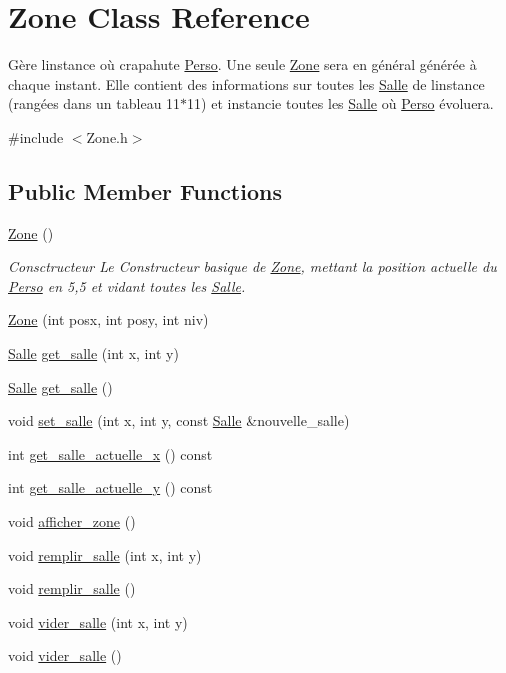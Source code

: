 \hypertarget{classZone}{}\section{Zone Class Reference}
\label{classZone}


Gère l\textquotesingle{}instance où crapahute \hyperlink{classPerso}{Perso}. Une seule \hyperlink{classZone}{Zone} sera en général générée à chaque instant. Elle contient des informations sur toutes les \hyperlink{classSalle}{Salle} de l\textquotesingle{}instance (rangées dans un tableau 11$\ast$11) et instancie toutes les \hyperlink{classSalle}{Salle} où \hyperlink{classPerso}{Perso} évoluera.  




{\ttfamily \#include $<$Zone.\+h$>$}

\subsection*{Public Member Functions}
\begin{DoxyCompactItemize}
\item 
\hyperlink{classZone_a37c9721c0d592a7a231f4e6dbae93277}{Zone} ()
\begin{DoxyCompactList}\small\item\em Consctructeur Le Constructeur basique de \hyperlink{classZone}{Zone}, mettant la position actuelle du \hyperlink{classPerso}{Perso} en 5,5 et vidant toutes les \hyperlink{classSalle}{Salle}. \end{DoxyCompactList}\item 
\hyperlink{classZone_a47c33a8aad7a0c17ff8ab213aad492f7}{Zone} (int posx, int posy, int niv)
\item 
\hyperlink{classSalle}{Salle} \hyperlink{classZone_a6b28456d584e884cdeceaf6d4dcedbd1}{get\+\_\+salle} (int x, int y)
\item 
\hyperlink{classSalle}{Salle} \hyperlink{classZone_ab49f3b9677e9111970689cf26fa47b00}{get\+\_\+salle} ()
\item 
void \hyperlink{classZone_a5c68a620d5c32cd2bf26272aeaee557d}{set\+\_\+salle} (int x, int y, const \hyperlink{classSalle}{Salle} \&nouvelle\+\_\+salle)
\item 
int \hyperlink{classZone_a5cba037223549a19e4717c9a502895ca}{get\+\_\+salle\+\_\+actuelle\+\_\+x} () const 
\item 
int \hyperlink{classZone_a481d145df776bb245a223e6848b9a6d6}{get\+\_\+salle\+\_\+actuelle\+\_\+y} () const 
\item 
void \hyperlink{classZone_ae7fc481efb7e4bb2fc28bb5da0bbaf90}{afficher\+\_\+zone} ()
\item 
void \hyperlink{classZone_ae97ba3cc2a452803a66dbd3c0c84852b}{remplir\+\_\+salle} (int x, int y)
\item 
void \hyperlink{classZone_a76284023033d6b67f933b4656a8eb761}{remplir\+\_\+salle} ()
\item 
void \hyperlink{classZone_a296f45a66db2f5ad565d15274f628e72}{vider\+\_\+salle} (int x, int y)
\item 
void \hyperlink{classZone_a0f61f5c9028db56ef251371818b31b35}{vider\+\_\+salle} ()
\end{DoxyCompactItemize}


